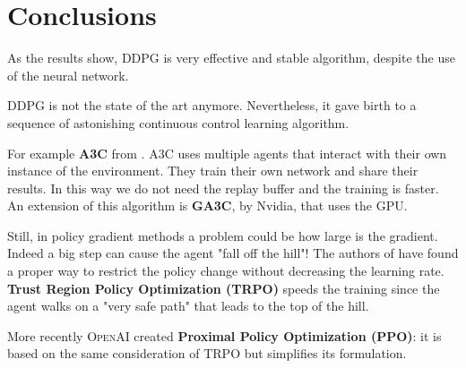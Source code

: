 \documentclass[10pt,a4paper]{scrartcl}
\begin{document}
\section{Conclusions}

As the results show, DDPG is very effective and stable algorithm, despite the use of the neural network.

DDPG is not the state of the art anymore. Nevertheless, it gave birth to a sequence of astonishing continuous control learning algorithm.

For example \textbf{A3C} from \cite{pmlr-v48-mniha16}. A3C uses multiple agents that interact with their own instance of the environment. They train their own network and share their results. In this way we do not need the replay buffer and the training is faster. An extension of this algorithm is \textbf{GA3C}, by Nvidia, that uses the GPU.

Still, in policy gradient methods a problem could be how large is the gradient. Indeed  a big step can cause the agent "fall off the hill"! The authors of \cite{pmlr-v37-schulman15} have found a proper way to restrict the policy change without decreasing the learning rate. \textbf{Trust Region Policy Optimization (TRPO)} speeds the training since the agent walks on a "very safe path" that leads to the top of the hill.

More recently \textsc{OpenAI} created \textbf{Proximal Policy Optimization (PPO)}: it is based on the same consideration of TRPO but simplifies its formulation.  

\nocite{DDPG_pemami}
\nocite{Simonini}
\nocite{Ben_Lau}



\clearpage




\end{document}
